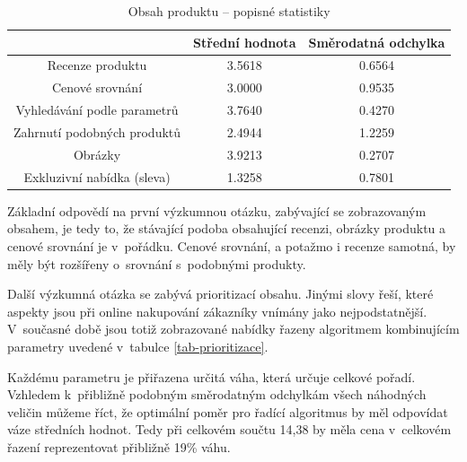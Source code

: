 \documentclass[12pt,twoside,openany]{fithesis}
\begin{document}
\begin{table}[htb]
    \begin{center}%
        \begin{tabular}{|c|c|c|}
            \hline 
            {{}} & {{Střední hodnota}} & {{Směrodatná odchylka}} 
\tabularnewline
             \hline 
             {{Recenze produktu}} & {{3.5618}} & {{0.6564}} \tabularnewline
              \hline 
              {{Cenové srovnání}} & {{3.0000}} & {{0.9535}} \tabularnewline
               \hline 
               {{Vyhledávání podle parametrů}} & {{3.7640}} & {{0.4270}} 
\tabularnewline
                \hline 
                {{Zahrnutí podobných produktů}} & {{2.4944}} & {{1.2259}} 
\tabularnewline
                 \hline 
                 {{Obrázky}} & {{3.9213}} & {{0.2707}} \tabularnewline
                  \hline 
                  {{Exkluzivní nabídka (sleva)}} & {{1.3258}} & {{0.7801}} 
\tabularnewline
                  \hline 
              \end{tabular}
              \caption{Obsah produktu -- popisné statistiky}\label{tobsah}
          \end{center}
      \end{table}

Základní odpovědí na první výzkumnou otázku, zabývající se 
zobrazovaným obsahem, je tedy to, že stávající podoba obsahující 
recenzi, obrázky produktu a cenové srovnání je v~pořádku. Cenové 
srovnání, a potažmo i recenze samotná, by měly být rozšířeny 
o~srovnání s~podobnými produkty.

Další výzkumná otázka se zabývá prioritizací obsahu. Jinými 
slovy řeší, které aspekty jsou při online nakupování zákazníky 
vnímány jako nejpodstatnější. V~současné době jsou totiž zobrazované 
nabídky řazeny algoritmem kombinujícím parametry uvedené v~tabulce 
\hyperlink{tab-prioritizace}{\ref{tab-prioritizace}}.

Každému parametru je přiřazena určitá 
váha, která určuje celkové pořadí. Vzhledem k~přibližně podobným 
směrodatným odchylkám všech náhodných veličin můžeme říct, že 
optimální poměr pro řadící algoritmus by měl odpovídat váze 
středních hodnot. Tedy při celkovém součtu 14,38 by měla cena v~celkovém 
řazení reprezentovat přibližně 19\% váhu.
\end{document}
